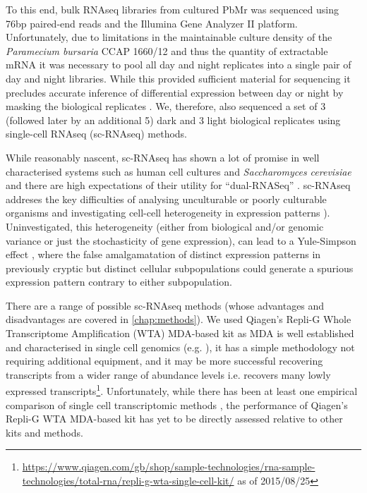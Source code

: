 To this end, bulk RNAseq libraries from cultured PbMr was sequenced using 76bp paired-end reads and the Illumina Gene Analyzer II platform.
Unfortunately, due to limitations in the maintainable culture density of the \textit{Paramecium bursaria} CCAP 1660/12 and thus the quantity of extractable
mRNA it was necessary to pool all day and night replicates into a single pair of day and night libraries. 
While this provided sufficient material for sequencing it precludes accurate inference of differential expression between day or night
by masking the biological replicates \citep{Auer2010}.  We, therefore, also sequenced a set of 3 (followed later by an additional 5) dark and 3 light
biological replicates using single-cell RNAseq (sc-RNAseq) methods. 


While reasonably nascent, sc-RNAseq has shown a lot of promise in well characterised systems such as human cell cultures \citep{Bengtsson2005,Shalek2013}
and \textit{Saccharomyces cerevisiae} \citep{Lipson2009} and there are high expectations
of their utility for ``dual-RNASeq'' \citep{Westermann2012}.  sc-RNAseq addreses 
the key difficulties of analysing unculturable or poorly culturable organisms \citep{Murray2012} and investigating
cell-cell heterogeneity in expression patterns \citep{Raj2008,Shalek2013}).  
Uninvestigated, this heterogeneity (either from biological and/or genomic variance or just the stochasticity of gene expression),
can lead to a Yule-Simpson effect \citep{Yule1903a,Simpson1951}, where the false amalgamatation of distinct expression patterns
in previously cryptic but distinct cellular subpopulations could generate a spurious expression pattern contrary to either subpopulation.


There are a range of possible sc-RNAseq methods (whose advantages and disadvantages are covered in \ref{chap:methods}).
We used Qiagen's Repli-G Whole Transcriptome Amplification (WTA) MDA-based kit as MDA 
is well established and characterised in single cell genomics (e.g. \citep{Spits2006}), it has a simple methodology not requiring additional equipment, and it may be more successful 
recovering transcripts from a wider range of abundance levels i.e. recovers many lowly expressed transcripts\footnote{
\url{https://www.qiagen.com/gb/shop/sample-technologies/rna-sample-technologies/total-rna/repli-g-wta-single-cell-kit/} as of 2015/08/25}.
Unfortunately, while there has been at least one empirical comparison of single cell transcriptomic methods \citep{Wu2014a}, the performance of
Qiagen's Repli-G WTA MDA-based kit has yet to be directly assessed relative to other kits and methods. 

